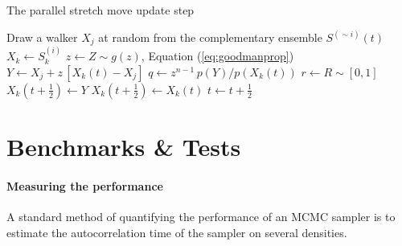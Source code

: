 \documentclass[12pt,preprint]{aastex}
\newcommand{\Eq}[1]{Equation (\ref{eq:#1})}
\newcommand{\eq}[1]{Equation (\ref{eq:#1})}
\newcommand{\sectlabel}[1]{\label{sect:#1}}
\newcommand{\algolabel}[1]{\label{algo:#1}}
\newcommand{\ensemble}{S}
\newcommand{\colorens}[1]{\ensemble^{(#1)}}
\renewcommand{\vector}[1]{#1}
\begin{document}
\begin{algorithm}
\caption{The parallel stretch move update step
    \algolabel{parallel}}
\begin{algorithmic}[1]
     \label{line:parallelloop}
        \STATE Draw a walker $\vector{X_j}$ at random from the complementary %
            ensemble $\colorens{\sim i} (t)$
        \STATE $\vector{X_k} \gets \colorens{i}_k$
        \STATE $z \gets Z \sim g(z)$, \Eq{goodmanprop}
        \STATE $\vector{Y} \gets \vector{X_j}
                + z \, [ \vector{X_k} (t) - \vector{X_j}]$
        \STATE $q \gets z^{n-1} \, p(\vector{Y})/p(\vector{X}_k(t))$
        \STATE $r \gets R \sim [0, 1]$
        \IF{$r \ge q$, \eq{acceptance}}
            \STATE $\vector{X_k} (t+\frac{1}{2}) \gets \vector{Y}$
        \ELSE
            \STATE $\vector{X_k} (t+\frac{1}{2}) \gets \vector{X_k}(t)$
        \ENDIF
    \ENDFOR
    \STATE $t \gets t+\frac{1}{2}$
\ENDFOR

\end{algorithmic}
\end{algorithm}

\section{Benchmarks \& Tests} \sectlabel{tests}

\paragraph{Measuring the performance}

A standard method of quantifying the performance of an MCMC sampler is to
estimate the autocorrelation time of the sampler on several densities.
\end{document}
